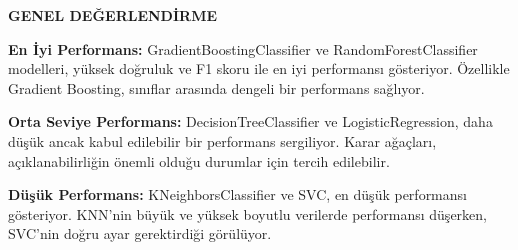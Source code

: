 \documentclass[twocolumn]{article}
\begin{document}
\begin{flushleft}
		\textbf{GENEL DEĞERLENDİRME}
		\item \textbf{En İyi Performans:} GradientBoostingClassifier ve RandomForestClassifier modelleri, yüksek doğruluk ve F1 skoru ile en iyi performansı gösteriyor. Özellikle Gradient Boosting, sınıflar arasında dengeli bir performans sağlıyor.
		\item \textbf{Orta Seviye Performans:} DecisionTreeClassifier ve LogisticRegression, daha düşük ancak kabul edilebilir bir performans sergiliyor. Karar ağaçları, açıklanabilirliğin önemli olduğu durumlar için tercih edilebilir.
		\item \textbf{Düşük Performans:} KNeighborsClassifier ve SVC, en düşük performansı gösteriyor. KNN'nin büyük ve yüksek boyutlu verilerde performansı düşerken, SVC'nin doğru ayar gerektirdiği görülüyor.
		
		
		
		
		\renewcommand\refname{Kaynakça}
		
		
	\end{flushleft}
	
	
	
	
	
	
	
	
	
	
	
	
	
	
	
	
	
	
	
	
	
	
	
	
\end{document}

